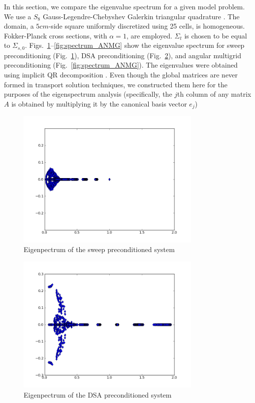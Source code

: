 \documentclass[preprint,10pt]{elsarticle}
\renewcommand{\(}{\left(}
\renewcommand{\)}{\right)}
\renewcommand{\[}{\left[}
\renewcommand{\]}{\right]}
\newcommand{\fig}[1]{Fig.~\ref{#1}}                      %
\begin{document}
In this section, we compare the eigenvalue spectrum for a given model problem. We use a $S_8$
Gauss-Legendre-Chebyshev Galerkin triangular quadrature  \cite{galerkin_quad_sanchez}. 
The domain, a $5cm$-side
square uniformly discretized using 25 cells, is homogeneous.  Fokker-Planck
cross sections, with $\alpha=1$, are employed. $\Sigma_t$ is chosen to be equal to
$\Sigma_{s,0}$. Figs.~\ref{fig:spectrum_sweep}--\ref{fig:spectrum_ANMG} show the eigenvalue spectrum
for sweep preconditioning (\fig{fig:spectrum_sweep}), DSA preconditioning (\fig{fig:spectrum_DSA}),
and angular multigrid preconditioning (\fig{fig:spectrum_ANMG}). The eigenvalues were obtained using 
implicit QR decomposition \cite{implicitQR}. 
Even though the global matrices are never formed in transport solution techniques, we constructed them here for the purposes of the eigenspectrum analysis (specifically, the $j$th column of any matrix $A$ is obtained by multiplying it by the canonical basis vector
$e_j$)

\begin{figure}[H]
\centering
\includegraphics[width=9cm]{s8_5_5}
\caption{Eigenpectrum of the sweep preconditioned system}
\label{fig:spectrum_sweep}
\end{figure}

\begin{figure}[H]
\centering
\includegraphics[width=9cm]{d_s8_5_5}
\caption{Eigenpectrum of the DSA preconditioned system}
\label{fig:spectrum_DSA}
\end{figure}
\end{document}
